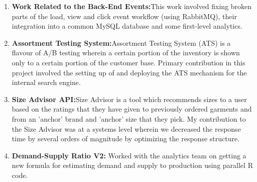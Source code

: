 \documentclass[11pt,a4paper,sans]{moderncv} %
\begin{document}
{\begin{enumerate}
\item \textbf{Work Related to the Back-End Events:}This work involved fixing broken parts of the load, view and click event workflow (using RabbitMQ), their integration into a common MySQL database and some first-level analytics.
\item \textbf{Assortment Testing System:}Assortment Testing System (ATS) is a flavour of A/B testing wherein a certain portion of the inventory is shown only to a certain portion of the customer base. Primary contribution in this project involved the setting up of and deploying the ATS mechanism for the internal search engine.
\item \textbf{Size Advisor API:}Size Advisor is a tool which recommends sizes to a user based on the ratings that they have given to previously ordered garments and from an 'anchor' brand and 'anchor' size that they pick. My contribution to the Size Advisor was at a systems level wherein we decreased the response time by several orders of magnitude by optimizing the response structure.
\item \textbf{Demand-Supply Ratio V2:} Worked with the analytics team on getting a new formula for estimating demand and supply to production using parallel R code.
\end{enumerate}
}
\end{document}

